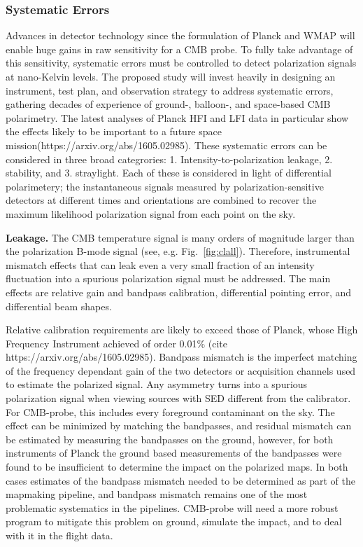 \subsubsection{Systematic Errors}
Advances in detector technology since the formulation of Planck and WMAP will enable huge gains in raw sensitivity for a CMB probe. 
To fully take advantage of this sensitivity, systematic errors must be
controlled to detect polarization signals at nano-Kelvin levels. 
The proposed study will invest heavily in designing an instrument,
test plan, and observation strategy to address systematic errors,
gathering decades of experience of ground-, balloon-, and
space-based CMB polarimetry.  The latest analyses of Planck HFI and
LFI data in particular show the effects likely to be important to a
future space mission(https://arxiv.org/abs/1605.02985).
These systematic errors can be considered in three broad categrories:
1. Intensity-to-polarization leakage, 2. stability, and
3. straylight. 
Each of these is considered in light of differential
polarimetery; the instantaneous signals measured by
polarization-sensitive detectors at different times and orientations are combined to recover
the maximum likelihood polarization signal from each point on the sky.

\textbf{Leakage.} The CMB temperature signal is many orders of magnitude larger than the
polarization B-mode signal (see, e.g. Fig.~\ref{fig:clall}). 
 Therefore, instrumental mismatch effects that can leak
even a very small fraction of an intensity fluctuation into a spurious  polarization
signal must be addressed.  The main effects are relative gain and
bandpass calibration, differential pointing error, and differential beam
shapes.

Relative calibration requirements are likely to exceed those of
Planck, whose High Frequency Instrument achieved of order 0.01\% (cite
https://arxiv.org/abs/1605.02985).
Bandpass mismatch is the imperfect matching of the frequency dependant gain of the two detectors or acquisition channels used to estimate the polarized signal.  Any asymmetry turns into a spurious polarization signal when viewing sources with SED different from the calibrator. For CMB-probe, this includes every foreground contaminant on the sky.  The effect can be minimized by matching the bandpasses, and residual mismatch can be estimated by measuring the bandpasses on the ground, however, for both instruments of Planck the ground based measurements of the bandpasses were found to be insufficient to determine the impact on the polarized maps. In both cases estimates of the bandpass mismatch needed to be determined as part of the mapmaking pipeline, and bandpass mismatch remains one of the most problematic systematics in the pipelines. CMB-probe will need a more robust program to mitigate this problem on ground, simulate the impact, and to deal with it in the flight data.

